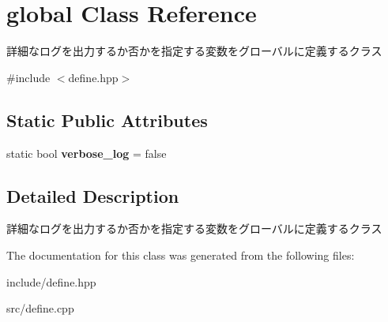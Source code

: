 \hypertarget{classglobal}{}\section{global Class Reference}
\label{classglobal}


詳細なログを出力するか否かを指定する変数をグローバルに定義するクラス  




{\ttfamily \#include $<$define.\+hpp$>$}

\subsection*{Static Public Attributes}
\begin{DoxyCompactItemize}
\item 
\mbox{\label{classglobal_ab592bc1528ebc1ea13f375a9235d445e}} 
static bool {\bfseries verbose\+\_\+log} = false
\end{DoxyCompactItemize}


\subsection{Detailed Description}
詳細なログを出力するか否かを指定する変数をグローバルに定義するクラス 

The documentation for this class was generated from the following files\+:\begin{DoxyCompactItemize}
\item 
include/define.\+hpp\item 
src/define.\+cpp\end{DoxyCompactItemize}
